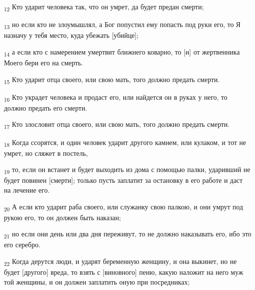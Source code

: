 \begin{tcolorbox}
\textsubscript{12} Кто ударит человека так, что он умрет, да будет предан смерти;
\end{tcolorbox}
\begin{tcolorbox}
\textsubscript{13} но если кто не злоумышлял, а Бог попустил ему попасть под руки его, то Я назначу у тебя место, куда убежать [убийце];
\end{tcolorbox}
\begin{tcolorbox}
\textsubscript{14} а если кто с намерением умертвит ближнего коварно, то [и] от жертвенника Моего бери его на смерть.
\end{tcolorbox}
\begin{tcolorbox}
\textsubscript{15} Кто ударит отца своего, или свою мать, того должно предать смерти.
\end{tcolorbox}
\begin{tcolorbox}
\textsubscript{16} Кто украдет человека и продаст его, или найдется он в руках у него, то должно предать его смерти.
\end{tcolorbox}
\begin{tcolorbox}
\textsubscript{17} Кто злословит отца своего, или свою мать, того должно предать смерти.
\end{tcolorbox}
\begin{tcolorbox}
\textsubscript{18} Когда ссорятся, и один человек ударит другого камнем, или кулаком, и тот не умрет, но сляжет в постель,
\end{tcolorbox}
\begin{tcolorbox}
\textsubscript{19} то, если он встанет и будет выходить из дома с помощью палки, ударивший не будет повинен [смерти]; только пусть заплатит за остановку в его работе и даст на лечение его.
\end{tcolorbox}
\begin{tcolorbox}
\textsubscript{20} А если кто ударит раба своего, или служанку свою палкою, и они умрут под рукою его, то он должен быть наказан;
\end{tcolorbox}
\begin{tcolorbox}
\textsubscript{21} но если они день или два дня переживут, то не должно наказывать его, ибо это его серебро.
\end{tcolorbox}
\begin{tcolorbox}
\textsubscript{22} Когда дерутся люди, и ударят беременную женщину, и она выкинет, но не будет [другого] вреда, то взять с [виновного] пеню, какую наложит на него муж той женщины, и он должен заплатить оную при посредниках;
\end{tcolorbox}
